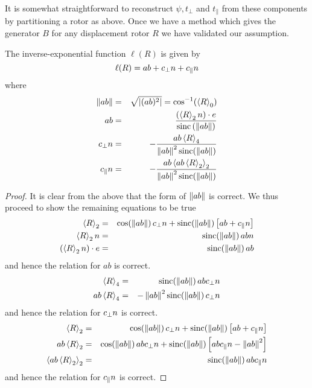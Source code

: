 It is somewhat straightforward to reconstruct $\psi, t_\perp$ and $t_\parallel$ from these
components by partitioning a rotor as above. Once we have a method which gives the
generator $B$ for any displacement rotor $R$ we have validated our assumption.

\begin{thm}
The inverse-exponential function $\ell(R)$ is given by
\[
\ell(R) = ab + c_\perp n + c_\parallel n
\]
where
\begin{eqnarray*}
\left\Vert ab \right\Vert & = & \sqrt{\left| (ab)^2 \right|}  = \cos^{-1}(\left<R\right>_0) \\
ab & = & \frac{\left(\left<R\right>_2 n \right) \cdot e}
{\mathrm{sinc}\left(\left\Vert ab \right\Vert\right)}\\
c_\perp n & = & - \frac{ab \left<R\right>_4}
{\left\Vert ab \right\Vert^2\mathrm{sinc}(\left\Vert ab \right\Vert)} \\
c_\parallel n & = & - \frac{ab \left<ab \left<R\right>_2\right>_2}
{\left\Vert ab \right\Vert^2\mathrm{sinc}(\left\Vert ab \right\Vert)}
\end{eqnarray*}
\end{thm}
\begin{proof}
It is clear from the above that the form of
$\left\Vert ab \right\Vert$ is correct. We thus proceed to show the remaining
equations to be true
\begin{eqnarray*}
\left<R\right>_2 & = & \cos(\left\Vert ab \right\Vert) \, c_\perp n +
\mathrm{sinc}(\left\Vert ab \right\Vert) \left[ab + c_\parallel n\right]\\
\left<R\right>_2 n & = & \mathrm{sinc}(\left\Vert ab \right\Vert) \, abn\\
\left(\left<R\right>_2 n\right) \cdot e & = & \mathrm{sinc}(\left\Vert ab \right\Vert) \, ab
\end{eqnarray*}
and hence the relation for $ab$ is correct.
\begin{eqnarray*}
\left<R\right>_4 & = & \mathrm{sinc}(\left\Vert ab \right\Vert) \, abc_\perp n \\
ab \left<R\right>_4 & = & -\left\Vert ab \right\Vert^2 \mathrm{sinc}(\left\Vert ab \right\Vert) \, c_\perp n 
\end{eqnarray*}
and hence the relation for $c_\perp n$ is correct.
\begin{eqnarray*}
\left<R\right>_2 & = & \cos(\left\Vert ab \right\Vert) \, c_\perp n +
\mathrm{sinc}(\left\Vert ab \right\Vert) \left[ab + c_\parallel n\right]\\
ab \left<R\right>_2 & = & \cos(\left\Vert ab \right\Vert) \, abc_\perp n +
\mathrm{sinc}(\left\Vert ab \right\Vert) \left[ab c_\parallel n - \left\Vert ab \right\Vert^2\right]\\
\left<ab \left<R\right>_2\right>_2 & = & 
\mathrm{sinc}(\left\Vert ab \right\Vert) \, ab c_\parallel n
\end{eqnarray*}
and hence the relation for $c_\parallel n$ is correct.
\end{proof}

